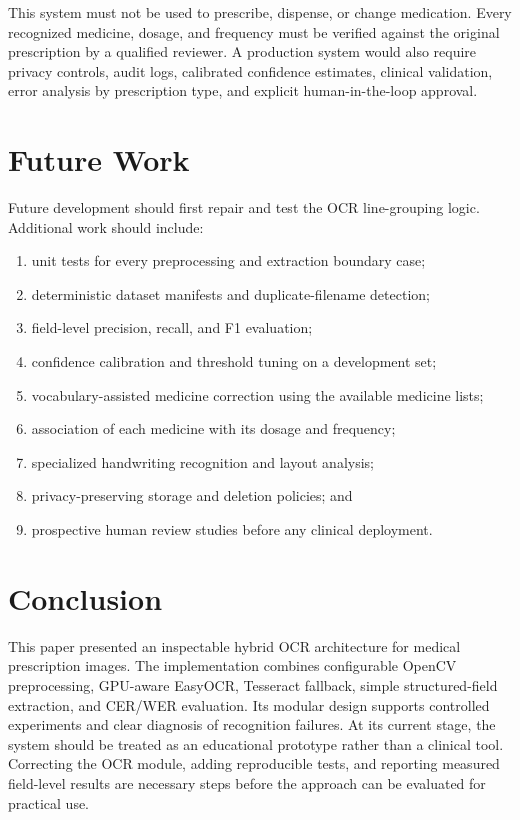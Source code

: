 \documentclass[conference]{IEEEtran}
\begin{document}
This system must not be used to prescribe, dispense, or change medication.
Every recognized medicine, dosage, and frequency must be verified against the
original prescription by a qualified reviewer. A production system would also
require privacy controls, audit logs, calibrated confidence estimates,
clinical validation, error analysis by prescription type, and explicit
human-in-the-loop approval.

\section{Future Work}
\label{sec:future}

Future development should first repair and test the OCR line-grouping logic.
Additional work should include:

\begin{enumerate}
    \item unit tests for every preprocessing and extraction boundary case;
    \item deterministic dataset manifests and duplicate-filename detection;
    \item field-level precision, recall, and F1 evaluation;
    \item confidence calibration and threshold tuning on a development set;
    \item vocabulary-assisted medicine correction using the available medicine
    lists;
    \item association of each medicine with its dosage and frequency;
    \item specialized handwriting recognition and layout analysis;
    \item privacy-preserving storage and deletion policies; and
    \item prospective human review studies before any clinical deployment.
\end{enumerate}

\section{Conclusion}
\label{sec:conclusion}

This paper presented an inspectable hybrid OCR architecture for medical
prescription images. The implementation combines configurable OpenCV
preprocessing, GPU-aware EasyOCR, Tesseract fallback, simple structured-field
extraction, and CER/WER evaluation. Its modular design supports controlled
experiments and clear diagnosis of recognition failures. At its current stage,
the system should be treated as an educational prototype rather than a
clinical tool. Correcting the OCR module, adding reproducible tests, and
reporting measured field-level results are necessary steps before the approach
can be evaluated for practical use.
\end{document}
